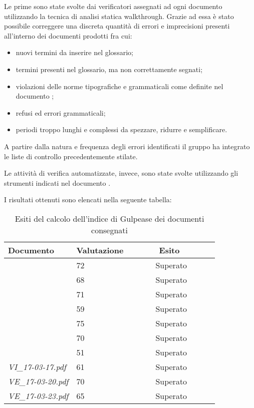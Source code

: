 		Le prime sono state svolte dai verificatori assegnati ad ogni documento utilizzando la tecnica di 					analisi statica walkthrough. Grazie ad essa è stato possibile correggere una discreta quantità di errori e imprecisioni presenti all'interno dei documenti prodotti fra cui: 
		\begin{itemize}	
			\item nuovi termini da inserire nel glossario;
			\item termini presenti nel glossario, ma non correttamente segnati;
			\item violazioni delle norme tipografiche e grammaticali come definite nel documento \NdP;
			\item refusi ed errori grammaticali;
			\item periodi troppo lunghi e complessi da spezzare, ridurre e semplificare.
		\end{itemize}
		A partire dalla natura e frequenza degli errori identificati il gruppo ha integrato le liste di controllo precedentemente stilate.

		Le attività di verifica automatizzate, invece, sono state svolte utilizzando gli strumenti indicati nel documento \NdP. 
		
		I risultati ottenuti sono elencati nella seguente tabella:
		\begin{table}[H]
		\begin{tabular}{|l|l|l|}
		\hline
		\textbf{Documento} 		&\textbf{Valutazione} &\textbf{~~~~~~Esito~~~~~~} \\
		\hline
		\PdQ 					&72		&~~~~~~Superato~~~~~~\\
		\NdP 					&68		&~~~~~~Superato~~~~~~\\
		\AdR 					&71		&~~~~~~Superato~~~~~~\\
		\PdP 					&59		&~~~~~~Superato~~~~~~\\
		\ST 					&75		&~~~~~~Superato~~~~~~\\
		\DP 					&70		&~~~~~~Superato~~~~~~\\	
		\Glossario 				&51		&~~~~~~Superato~~~~~~\\
		\textit{VI_17-03-17.pdf} 		&61		&~~~~~~Superato~~~~~~\\
		\textit{VE_17-03-20.pdf} 		&70		&~~~~~~Superato~~~~~~\\
		\textit{VE_17-03-23.pdf} 		&65		&~~~~~~Superato~~~~~~\\
		\hline
		\end{tabular}
		\caption{Esiti del calcolo dell'indice di Gulpease dei documenti consegnati}
		\end{table}
		
